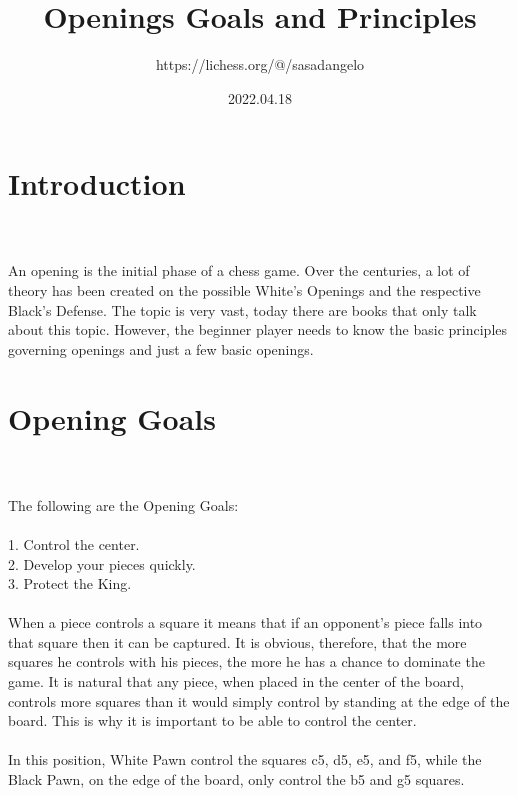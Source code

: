 \documentclass{article}
\title{Openings Goals and Principles}
\author{https://lichess.org/@/sasadangelo}
\date{2022.04.18}
\begin{document}
\begin{titlepage}
\maketitle
\end{titlepage}
\section{ Introduction}

\\
\\
An opening is the initial phase of a chess game. Over the centuries, a lot of theory has been created on the possible White's Openings and the respective Black's Defense. The topic is very vast, today there are books that only talk about this topic. However, the beginner player needs to know the basic principles governing openings and just a few basic openings.\section{ Opening Goals}

\\
\\
The following are the Opening Goals:\\\\1. Control the center.\\2. Develop your pieces quickly.\\3. Protect the King.\\\\When a piece controls a square it means that if an opponent's piece falls into that square then it can be captured. It is obvious, therefore, that the more squares he controls with his pieces, the more he has a chance to dominate the game. It is natural that any piece, when placed in the center of the board, controls more squares than it would simply control by standing at the edge of the board. This is why it is important to be able to control the center.\\\\In this position, White Pawn control the squares c5, d5, e5, and f5, while the Black Pawn, on the edge of the board, only control the b5 and g5 squares.\\\\

\end{document}
